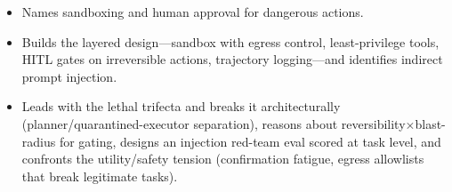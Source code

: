 \begin{interviewq}
\goodgreat
\begin{itemize}
    \item {} Names sandboxing and human approval for dangerous actions.
    \item {} Builds the layered design---sandbox with egress control, least-privilege tools, HITL gates on irreversible actions, trajectory logging---and identifies indirect prompt injection.
    \item {} Leads with the lethal trifecta and breaks it architecturally (planner/quarantined-executor separation), reasons about reversibility$\times$blast-radius for gating, designs an injection red-team eval scored at task level, and confronts the utility/safety tension (confirmation fatigue, egress allowlists that break legitimate tasks).
\end{itemize}

\end{interviewq}


